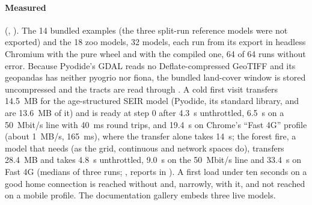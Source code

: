 \paragraph{Measured} (, ). The 14
bundled examples (the three split-run reference models were not exported) and
the 18 zoo models, 32 models, each run from its export in headless Chromium with the pure
wheel and with the compiled one, 64 of 64 runs without error. Because Pyodide's GDAL reads no Deflate-compressed GeoTIFF and
its geopandas has neither pyogrio nor fiona, the bundled land-cover window is stored
uncompressed and the tracts are read through . A cold
first visit transfers 14.5~MB for the age-structured SEIR model
(Pyodide, its standard library,  and  are 13.6~MB of it) and is
ready at step 0 after 4.3~s unthrottled, 6.5~s on a 50~Mbit/s line with 40~ms round trips, and
19.4~s on Chrome's ``Fast 4G'' profile (about 1~MB/s, 165~ms), where the transfer alone takes
14~s; the forest fire, a model that needs  (as the grid, continuous and network
spaces do), transfers 28.4~MB and takes 4.8~s unthrottled, 9.0~s on the 50~Mbit/s line and
33.4~s on Fast 4G (medians of three runs; , reports in
). A first load
under ten seconds on a good home connection is reached without  and, narrowly,
with it, and not reached on a mobile profile.
The documentation gallery embeds three live models.
